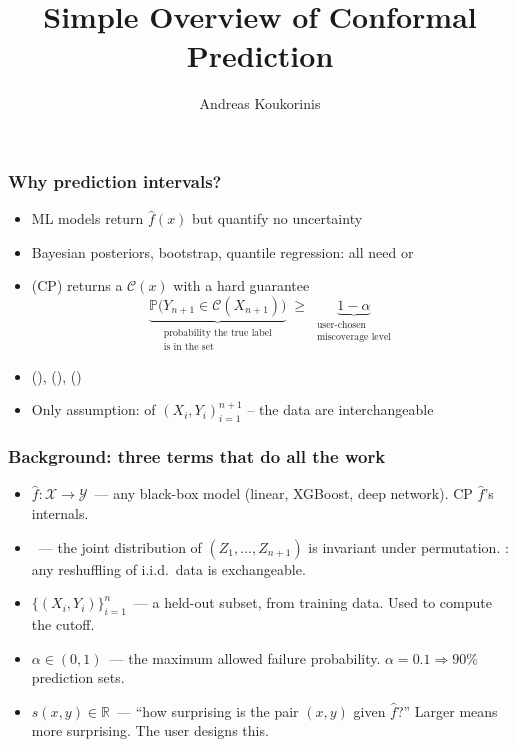 \documentclass[11pt, aspectratio=169, xcolor={dvipsnames}, usepdftitle=false]{beamer}
\title{Simple Overview of Conformal Prediction}
\author{Andreas Koukorinis}
\date{}
\begin{document}
\frame{\titlepage}

\begin{frame}
\frametitle{Why prediction intervals?}
\begin{itemize}
\item ML models return  $\hat{f}(x)$ but quantify no uncertainty
\item Bayesian posteriors, bootstrap, quantile regression: all need  or 
\item {} (CP) returns a  $\mathcal{C}(x)$ with a hard guarantee
\begin{equation*}
\underbrace{\mathbb{P}\bigl(Y_{n+1} \in \mathcal{C}(X_{n+1})\bigr)}_{\substack{\text{probability the true label}\\\text{is in the set}}}
\;\geq\;
\underbrace{1 - \alpha}_{\substack{\text{user-chosen}\\\text{miscoverage level}}}
\end{equation*}
\item {} (),  (),  ()
\item Only assumption:  of $(X_i, Y_i)_{i=1}^{n+1}$ -- the data are interchangeable
\end{itemize}
\end{frame}

\begin{frame}
\frametitle{Background: three terms that do all the work}
\begin{itemize}
\item {} $\hat{f}: \mathcal{X} \to \mathcal{Y}$~--- any black-box model (linear, XGBoost, deep network). CP  $\hat{f}$'s internals.
\item {}~--- the joint distribution of $(Z_1, \ldots, Z_{n+1})$ is invariant under permutation. : any reshuffling of i.i.d.\ data is exchangeable.
\item {} $\{(X_i, Y_i)\}_{i=1}^n$~--- a held-out subset,  from training data. Used to compute the cutoff.
\item {} $\alpha \in (0, 1)$~--- the maximum allowed failure probability. $\alpha = 0.1 \Rightarrow 90\%$ prediction sets.
\item {} $s(x, y) \in \mathbb{R}$~--- ``how surprising is the pair $(x, y)$ given $\hat{f}$?'' Larger means more surprising. The user designs this.
\end{itemize}
\end{frame}
\end{document}
